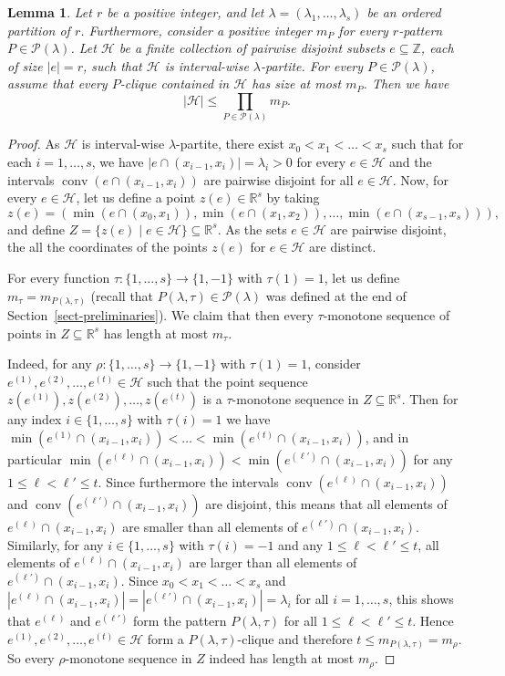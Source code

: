 \documentclass[10pt,a4paper]{article}
\newtheorem{lemma}[theorem]{Lemma}
\theoremstyle{definition}
\newcommand{\su}{\subseteq}
\newcommand{\Z}{\mathbb{Z}}
\newcommand{\HH}{\mathcal{H}}
\newcommand{\conv}{\operatorname{conv}}
\newcommand{\PP}{\mathcal{P}}
\begin{document}
\begin{lemma}\label{obs-interval-wise}
Let $r$ be a positive integer, and let $\lambda=(\lambda_1,\dots,\lambda_s)$ be an ordered partition of $r$. Furthermore, consider a positive integer $m_P$ for every $r$-pattern $P\in \PP(\lambda)$. Let $\HH$ be a finite collection of pairwise disjoint subsets $e\su \Z$, each of size $|e|=r$, such that $\HH$ is interval-wise $\lambda$-partite. For every $P\in \PP(\lambda)$, assume that every $P$-clique contained in $\HH$ has size at most $m_{P}$. Then we have
\[|\HH|\le \prod_{P\in \PP(\lambda)} m_{P}.\]
\end{lemma}

\begin{proof} 
    As $\HH$ is interval-wise $\lambda$-partite, there exist $x_0<x_1<\dots<x_{s}$ such that for each $i=1,\dots,s$, we have $|e\cap (x_{i-1},x_i)|=\lambda_i>0$ for every $e\in \HH$ and the intervals $\conv(e\cap (x_{i-1},x_i))$ are pairwise disjoint for all $e\in \HH$. Now, for every $e\in \HH$, let us define a point $z(e)\in \mathbb{R}^s$ by taking
    \[z(e)=(\min(e\cap (x_{0},x_1)), \min(e\cap (x_{1},x_2)), \dots, \min(e\cap (x_{s-1},x_s))),\]
    and define $Z=\{ z(e)\mid e\in \HH\}\su \mathbb{R}^s$. As the sets $e\in \HH$ are pairwise disjoint, the all the coordinates of the points $z(e)$ for $e\in \HH$ are distinct.
    
    For every function $\tau:\{1,\dots,s\}\to \{1,-1\}$ with $\tau(1)=1$, let us define $m_\tau=m_{P(\lambda,\tau)}$ (recall that $P(\lambda,\tau)\in \PP(\lambda)$ was defined at the end of Section~\ref{sect-preliminaries}). We claim that then every  $\tau$-monotone sequence of points in $Z\su \mathbb{R}^s$ has length at most $m_\tau$.

    Indeed, for any $\rho:\{1,\dots,s\}\to \{1,-1\}$ with $\tau(1)=1$, consider $e^{(1)},e^{(2)},\dots,e^{(t)}\in \HH$ such that the point sequence $z(e^{(1)}),z(e^{(2)}),\dots,z(e^{(t)})$ is a $\tau$-monotone sequence in $Z \su \mathbb{R}^s$. Then for any index $i\in \{1,\dots,s\}$ with $\tau(i)=1$ we have  $\min(e^{(1)}\cap (x_{i-1},x_i))< \dots <\min(e^{(t)}\cap (x_{i-1},x_i))$, and in particular $\min(e^{(\ell)}\cap (x_{i-1},x_i))<\min(e^{(\ell')}\cap (x_{i-1},x_i))$ for any $1\le \ell<\ell'\le t$. Since furthermore the intervals $\conv(e^{(\ell)}\cap (x_{i-1},x_i))$ and $\conv(e^{(\ell')}\cap (x_{i-1},x_i))$ are disjoint, this means that all elements of $e^{(\ell)}\cap (x_{i-1},x_i)$ are smaller than all elements of $e^{(\ell')}\cap (x_{i-1},x_i)$. Similarly, for any $i\in \{1,\dots,s\}$ with $\tau(i)=-1$ and any $1\le \ell<\ell'\le t$, all elements of $e^{(\ell)}\cap (x_{i-1},x_i)$ are larger than all elements of $e^{(\ell')}\cap (x_{i-1},x_i)$. Since $x_0<x_1<\dots<x_{s}$ and $|e^{(\ell)}\cap (x_{i-1},x_i)|=|e^{(\ell')}\cap (x_{i-1},x_i)|=\lambda_i$ for all  $i=1,\dots,s$, this shows that  $e^{(\ell)}$ and $e^{(\ell')}$ form the pattern $P(\lambda,\tau)$ for all $1\le \ell<\ell'\le t$. Hence $e^{(1)},e^{(2)},\dots,e^{(t)}\in \HH$ form a $P(\lambda,\tau)$-clique and therefore $t\le m_{P(\lambda,\tau)}=m_\rho$. So every $\rho$-monotone sequence in $Z$ indeed has length at most $m_\rho$.


\end{proof}
\end{document}
